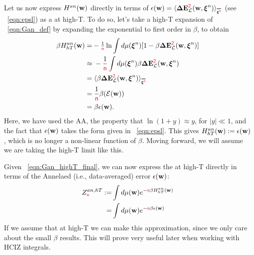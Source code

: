 

Let us now express $H^{an}({\mathbf{w}})$ directly in terms of $\EPSLw=\langle\DETOPXI \rangle_{\AVGNDXIn}$ (see \EQN~\ref{eqn:epsl}) as a \ThermalAverage at high-T.
To do so, let's take a high-T expansion of \EQN~\ref{eqn:Gan_def} 
by expanding the exponential to first order in $\beta$, to obtain
\begin{align}
\label{eqn:Gan_highT}
\beta\GANHT
=&  - \tfrac{1}{\ND}\ln \int d\mu(\NDXIn) [1-\beta \DETOPXI] \\ \nonumber
\approx&\;   - \frac{1}{\ND} \int d\mu(\NDXIn)\beta \DETOPXI \\ \nonumber
=&\;\langle \beta\DETOPXI \rangle_{\AVGNDXIn} \\ \nonumber
=&\;\frac{1}{\ND}\beta(\DETOT)\\ 
\label{eqn:Gan_highT_final}
=&\;\beta \EPSLw  .
\end{align}
Here, we have used the AA, the property that $\ln(1 + y) \approx y$, for $|y| \ll 1$, and the fact that $\epsilon({\mathbf{w}})$ takes the form given in \EQN~\ref{eqn:epsl}.
This gives $H^{an}_{hT}({\mathbf{w}}):=\epsilon({\mathbf{w}})$, which is no longer a non-linear function of $\beta$.
Moving forward, we will assume we are taking the high-T limit like this.

Given \EQN~\ref{eqn:Gan_highT_final}, we can now express the \Annealed \PartitionFunction at high-T directly in terms of
the Annelaed (i.e., data-averaged) error $\epsilon({\mathbf{w}})$:
\begin{align}
  \nonumber
  \label{eqn:Zanht_def}
Z^{an,hT}_{{\color{red}\sf{n}}} :=  &\int d\mu({\mathbf{w}}) e^{-{\color{red}\sf{n}}\beta H^{an}_{hT}({\mathbf{w}})} \\ 
  =  &\int d\mu({\mathbf{w}}) e^{-{\color{red}\sf{n}}\beta\epsilon({\mathbf{w}})} 
\end{align}
If we assume that at high-T we can make this approximation, 
since we only care about the small $\beta$ results. 
This will prove very useful later when working with HCIZ integrals.


